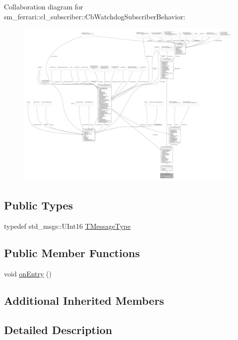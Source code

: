 Collaboration diagram for sm\+\_\+ferrari\+:\+:cl\+\_\+subscriber\+:\+:Cb\+Watchdog\+Subscriber\+Behavior\+:
\nopagebreak
\begin{figure}[H]
\begin{center}
\leavevmode
\includegraphics[width=350pt]{classsm__ferrari_1_1cl__subscriber_1_1CbWatchdogSubscriberBehavior__coll__graph}
\end{center}
\end{figure}
\subsection*{Public Types}
\begin{DoxyCompactItemize}
\item 
typedef std\+\_\+msgs\+::\+U\+Int16 \hyperlink{classsm__ferrari_1_1cl__subscriber_1_1CbWatchdogSubscriberBehavior_ac22e640521cd2031e0a1baaec2954195}{T\+Message\+Type}
\end{DoxyCompactItemize}
\subsection*{Public Member Functions}
\begin{DoxyCompactItemize}
\item 
void \hyperlink{classsm__ferrari_1_1cl__subscriber_1_1CbWatchdogSubscriberBehavior_aa477d3a1376c9c432fa830bcc5f63901}{on\+Entry} ()
\end{DoxyCompactItemize}
\subsection*{Additional Inherited Members}


\subsection{Detailed Description}


